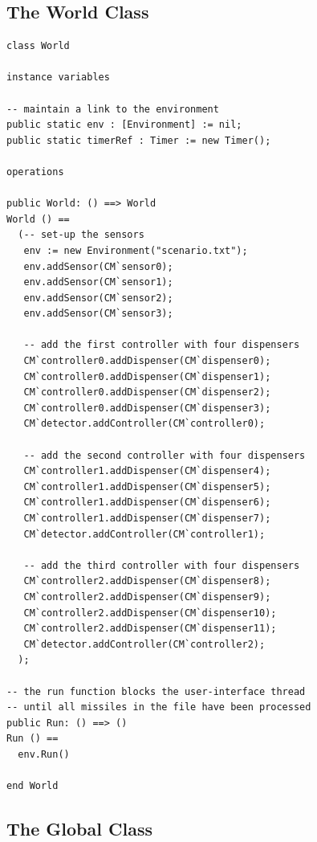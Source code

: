 \documentclass{overturerepchap}
\begin{document}
\subsection{The World Class}

\begin{lstlisting}
class World

instance variables
  
-- maintain a link to the environment
public static env : [Environment] := nil;
public static timerRef : Timer := new Timer();

operations

public World: () ==> World
World () ==
  (-- set-up the sensors
   env := new Environment("scenario.txt");
   env.addSensor(CM`sensor0);
   env.addSensor(CM`sensor1);
   env.addSensor(CM`sensor2);
   env.addSensor(CM`sensor3);

   -- add the first controller with four dispensers
   CM`controller0.addDispenser(CM`dispenser0);
   CM`controller0.addDispenser(CM`dispenser1);
   CM`controller0.addDispenser(CM`dispenser2);
   CM`controller0.addDispenser(CM`dispenser3);
   CM`detector.addController(CM`controller0);

   -- add the second controller with four dispensers
   CM`controller1.addDispenser(CM`dispenser4);
   CM`controller1.addDispenser(CM`dispenser5);
   CM`controller1.addDispenser(CM`dispenser6);
   CM`controller1.addDispenser(CM`dispenser7);
   CM`detector.addController(CM`controller1);
 
   -- add the third controller with four dispensers
   CM`controller2.addDispenser(CM`dispenser8);
   CM`controller2.addDispenser(CM`dispenser9);
   CM`controller2.addDispenser(CM`dispenser10);
   CM`controller2.addDispenser(CM`dispenser11);
   CM`detector.addController(CM`controller2);
  );

-- the run function blocks the user-interface thread
-- until all missiles in the file have been processed
public Run: () ==> ()
Run () == 
  env.Run()

end World
\end{lstlisting}

\subsection{The Global Class}
\end{document}
